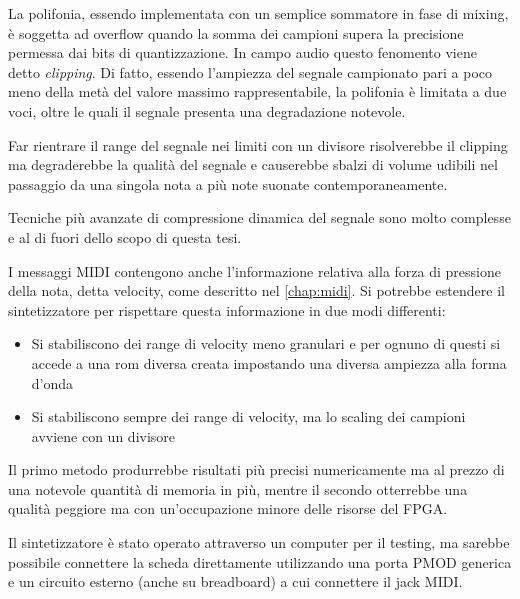 La polifonia, essendo implementata con un semplice sommatore in fase 
di mixing, è soggetta ad overflow quando la somma dei campioni supera
la precisione permessa dai  bits di quantizzazione.
In campo audio questo fenomento viene detto \textit{clipping}.
Di fatto, essendo l'ampiezza del segnale campionato pari a poco meno
della metà del valore massimo rappresentabile, la polifonia è limitata
a due voci, oltre le quali il segnale presenta una degradazione
notevole.

Far rientrare il range del segnale nei limiti con un divisore risolverebbe
il clipping ma degraderebbe la qualità del segnale e causerebbe
sbalzi di volume udibili nel passaggio da una singola nota  a più note
suonate contemporaneamente.

Tecniche più avanzate di compressione dinamica del segnale 
sono molto complesse e al di fuori dello scopo di questa tesi.  

I messaggi MIDI contengono anche l'informazione relativa alla forza
di pressione della nota, detta velocity, come descritto nel \cref{chap:midi}.
Si potrebbe estendere il sintetizzatore per rispettare questa informazione
in due modi differenti:
\begin{itemize}
  \item Si stabiliscono dei range di velocity meno granulari  e per ognuno
        di questi si accede a una rom diversa creata impostando una diversa 
        ampiezza alla forma d'onda
  \item Si stabiliscono sempre dei range di velocity, ma lo scaling dei
        campioni avviene con un divisore
\end{itemize}
Il primo metodo produrrebbe risultati più precisi numericamente ma al
prezzo di una notevole quantità di memoria in più, mentre il secondo
otterrebbe una qualità peggiore ma con un'occupazione minore delle
risorse del FPGA.

Il sintetizzatore è stato operato attraverso un 
computer per il testing, ma sarebbe possibile connettere la scheda
direttamente utilizzando una porta PMOD generica e un circuito esterno
(anche su breadboard) a cui connettere il jack MIDI.
